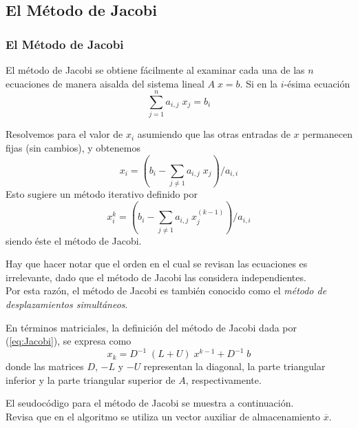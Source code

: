 \subsection{El Método de Jacobi}
\begin{frame}
\frametitle{El Método de Jacobi}
El método de Jacobi se obtiene fácilmente al examinar cada una de las $n$ ecuaciones de manera aisalda del sistema lineal $A \; x = b$. Si en la $i$-ésima ecuación
\begin{equation}
\sum_{j = 1}^{n} a_{i, j} \; x_{j} = b_{i} \nonumber
\end{equation}
\end{frame}
\begin{frame}
Resolvemos para el valor de $x_{i}$ asumiendo que las otras entradas de $x$ permanecen fijas (sin cambios), y obtenemos
\begin{equation}
x_{i} = (b_{i} - \sum_{j \neq 1} a_{i, j} \; x_{j}) / a_{i, i}
\end{equation}
\pause
Esto sugiere un método iterativo definido por
\begin{equation}\label{eq:Jacobi}
x_{i}^{k} = (b_{i} - \sum_{j \neq 1} a_{i, j} \; x_{j}^{(k - 1)})/a_{i, i}
\end{equation}
siendo éste el método de Jacobi.
\end{frame}
\begin{frame}
Hay que hacer notar que el orden en el cual se revisan las ecuaciones es irrelevante, dado que el método de Jacobi las considera independientes. 
\\
\bigskip
Por esta razón, el método de Jacobi es también conocido como el \textit{método de desplazamientos simultáneos}.
\end{frame}
\begin{frame}
En términos matriciales, la definición del método de Jacobi dada por (\ref{eq:Jacobi}), se expresa como
\begin{equation}
x_{k} =  D^{-1} \; (L + U) \; x^{k - 1} + D^{-1} \; b
\end{equation}
donde las matrices $D$, $-L$ y $-U$ representan la diagonal, la parte triangular inferior y la parte triangular superior de $A$, respectivamente.
\end{frame}
\begin{frame}
El seudocódigo para el método de Jacobi se muestra a continuación.
\\
\bigskip
Revisa que en el algoritmo se utiliza un vector auxiliar de almacenamiento $\overline{x}$.
\end{frame}
